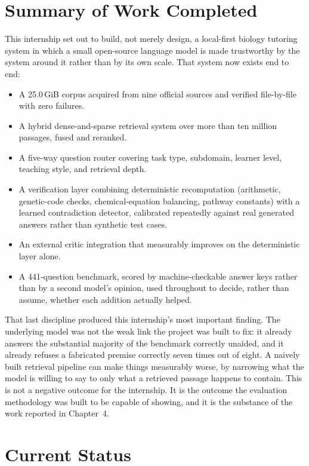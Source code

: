 \section{Summary of Work Completed}\label{5.1}

This internship set out to build, not merely design, a local-first biology
tutoring system in which a small open-source language model is made
trustworthy by the system around it rather than by its own scale. That
system now exists end to end:

\begin{itemize}
\item A 25.0\,GiB corpus acquired from nine official sources and verified
file-by-file with zero failures.
\item A hybrid dense-and-sparse retrieval system over more than ten
million passages, fused and reranked.
\item A five-way question router covering task type, subdomain, learner
level, teaching style, and retrieval depth.
\item A verification layer combining deterministic recomputation
(arithmetic, genetic-code checks, chemical-equation balancing, pathway
constants) with a learned contradiction detector, calibrated repeatedly
against real generated answers rather than synthetic test cases.
\item An external critic integration that measurably improves on the
deterministic layer alone.
\item A 441-question benchmark, scored by machine-checkable answer keys
rather than by a second model's opinion, used throughout to decide, rather
than assume, whether each addition actually helped.
\end{itemize}

That last discipline produced this internship's most important finding.
The underlying model was not the weak link the project was built to fix:
it already answers the substantial majority of the benchmark correctly
unaided, and it already refuses a fabricated premise correctly seven times
out of eight. A naively built retrieval pipeline can make things
measurably worse, by narrowing what the model is willing to say to only
what a retrieved passage happens to contain. This is not a negative
outcome for the internship. It is the outcome the evaluation methodology
was built to be capable of showing, and it is the substance of the work
reported in Chapter~4.

\section{Current Status}\label{5.2}

